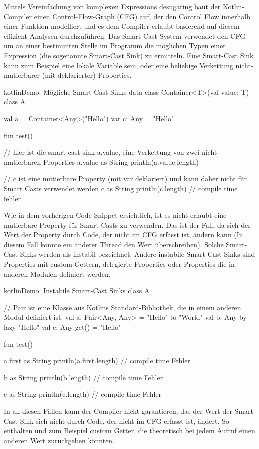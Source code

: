 Mittels Vereinfachung von komplexen Expressions \bzw desugaring baut der Kotlin-Compiler einen Control-Flow-Graph (CFG)
auf, der den Control Flow innerhalb einer Funktion modelliert und es dem Compiler erlaubt basierend auf diesem effizient
Analysen durchzuführen.
Das Smart-Cast-System verwendet den CFG um an einer bestimmten Stelle im Programm die möglichen Typen einer Expression
(die sogenannte Smart-Cast Sink) zu ermitteln.
Eine Smart-Cast Sink kann zum Beispiel eine lokale Variable sein, oder eine beliebige Verkettung nicht-mutierbarer
(mit  deklarierter) Properties.

\begin{codeBlock}{kotlin}{Demo: Mögliche Smart-Cast Sinks}
data class Container<T>(val value: T)
class A {
    val a = Container<Any>("Hello")
    var c: Any = "Hello"

    fun test() {
        // hier ist die smart cast sink a.value, eine Verkettung von zwei nicht-mutierbaren Properties
        a.value as String
        println(a.value.length)

        // c ist eine mutierbare Property (mit var deklariert) und kann daher nicht für Smart Casts verwendet werden
        c as String
        println(c.length) // compile time fehler
    }
}
\end{codeBlock}

Wie in dem vorherigen Code-Snippet ersichtlich, ist es nicht erlaubt eine mutierbare Property für Smart-Casts zu
verwenden.
Das ist der Fall, da sich der Wert der Property durch Code, der nicht im CFG erfasst ist, ändern kann (In diesem Fall
könnte ein anderer Thread den Wert überschreiben).
Solche Smart-Cast Sinks werden als instabil bezeichnet.
Andere instabile Smart-Cast Sinks sind \zB Properties mit custom Gettern, delegierte Properties oder Properties die
in anderen Modulen definiert werden.

\begin{codeBlock}{kotlin}{Demo: Instabile Smart-Cast Sinks}
class A {

    // Pair ist eine Klasse aus Kotlins Standard-Bibliothek, die in einem anderen Modul definiert ist.
    val a: Pair<Any, Any> = "Hello" to "World"
    val b: Any by lazy { "Hello" }
    val c: Any get() = "Hello"

    fun test() {
        a.first as String
        println(a.first.length) // compile time Fehler

        b as String
        println(b.length) // compile time Fehler

        c as String
        println(c.length) // compile time Fehler
    }
}
\end{codeBlock}

In all diesen Fällen kann der Compiler nicht garantieren, das der Wert der Smart-Cast Sink sich nicht durch Code,
der nicht im CFG erfasst ist, ändert.
So enthalten  und  zum Beispiel custom Getter, die theoretisch bei jedem Aufruf einen
anderen Wert zurückgeben könnten.

\renewcommand{\kapitelautor}{}
